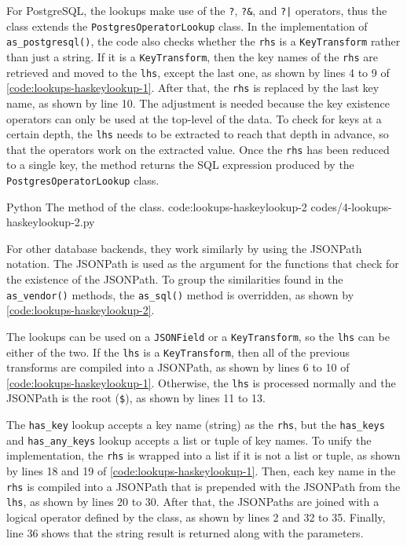For PostgreSQL, the lookups make use of the \verb|?|, \verb|?&|, and \verb=?|=
operators, thus the class extends the \verb|PostgresOperatorLookup| class. In
the implementation of \verb|as_postgresql()|, the code also checks whether the
\verb|rhs| is a \verb|KeyTransform| rather than just a string. If it is a
\verb|KeyTransform|, then the key names of the \verb|rhs| are retrieved and
moved to the \verb|lhs|, except the last one, as shown by lines 4 to 9 of
\autoref{code:lookups-haskeylookup-1}. After that, the \verb|rhs| is replaced
by the last key name, as shown by line 10. The adjustment is needed because the
key existence operators can only be used at the top-level of the data. To
check for keys at a certain depth, the \verb|lhs| needs to be extracted to
reach that depth in advance, so that the operators work on the extracted value.
Once the \verb|rhs| has been reduced to a single key, the method returns the
SQL expression produced by the \verb|PostgresOperatorLookup| class.

\listing
{Python}
{The  method of the  class.}
{code:lookups-haskeylookup-2}
{codes/4-lookups-haskeylookup-2.py}

For other database backends, they work similarly by using the JSONPath
notation. The JSONPath is used as the argument for the functions that check for
the existence of the JSONPath. To group the similarities found in the
\verb|as_vendor()| methods, the \verb|as_sql()| method is overridden, as shown
by \autoref{code:lookups-haskeylookup-2}.

The lookups can be used on a \verb|JSONField| or a \verb|KeyTransform|, so the
\verb|lhs| can be either of the two. If the \verb|lhs| is a
\verb|KeyTransform|, then all of the previous transforms are compiled into a
JSONPath, as shown by lines 6 to 10 of \autoref{code:lookups-haskeylookup-1}.
Otherwise, the \verb|lhs| is processed normally and the JSONPath is the root
(\verb|$|), as shown by lines 11 to 13.

The \verb|has_key| lookup accepts a key name (string) as the \verb|rhs|, but
the \verb|has_keys| and \verb|has_any_keys| lookup accepts a list or tuple of
key names. To unify the implementation, the \verb|rhs| is wrapped into a list
if it is not a list or tuple, as shown by lines 18 and 19 of
\autoref{code:lookups-haskeylookup-1}. Then, each key name in the \verb|rhs| is
compiled into a JSONPath that is prepended with the JSONPath from the
\verb|lhs|, as shown by lines 20 to 30. After that, the JSONPaths are joined
with a logical operator defined by the class, as shown by lines 2 and 32 to 35.
Finally, line 36 shows that the string result is returned along with the
parameters.

